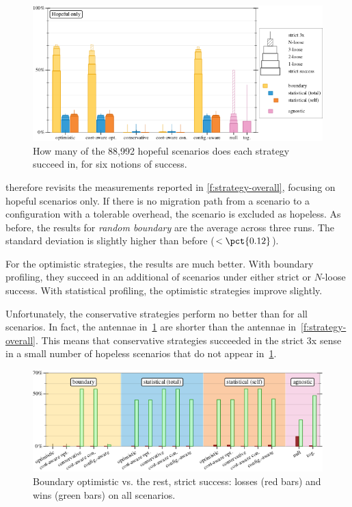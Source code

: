 \begin{figure}[ht]
  \includegraphics[width=\columnwidth]{data/strategy-overall-hopeful.pdf}
  \caption{How many of the 88,992 hopeful scenarios does each strategy succeed in, for six notions of success.}
  \label{f:strategy-hope}
\end{figure}

 therefore revisits the measurements reported in
\cref{f:strategy-overall}, focusing on hopeful scenarios only.  If there is no
migration path from a scenario to a configuration with a tolerable overhead, the
scenario is excluded as hopeless.  As before, the results for \emph{random
boundary} are the average across three runs.  The standard deviation is slightly
higher than before ($<\pct{0.12}$).

For the optimistic strategies, the results are much better.
With boundary profiling, they succeed in an additional  of
scenarios under either strict or $N$-loose success.  
With statistical profiling, the optimistic strategies
improve slightly.

Unfortunately, the conservative strategies perform no better than for all
scenarios.
In fact, the antennae
in~\cref{f:strategy-hope} are shorter than the antennae
in~\cref{f:strategy-overall}.  This means that conservative strategies
succeeded in the strict 3x sense in a small number of hopeless scenarios that
do not appear in~\cref{f:strategy-hope}.


\begin{figure}[ht]
  \includegraphics[width=0.9\columnwidth]{data/head-to-head.pdf}
  \caption{Boundary optimistic vs. the rest, strict success: losses (red bars) and wins (green bars) on all scenarios.}
  \label{f:head-to-head}
\end{figure}

